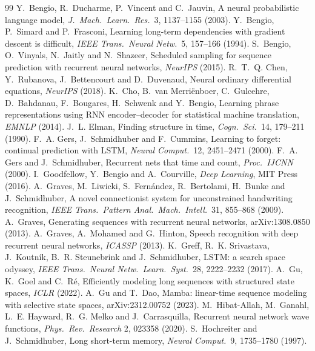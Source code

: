 \documentclass[11pt]{article}
\begin{document}
\begin{thebibliography}{99}\small
{} Y.~Bengio, R.~Ducharme, P.~Vincent and C.~Jauvin, A neural probabilistic language model, \emph{J.\ Mach.\ Learn.\ Res.}\ 3, 1137--1155 (2003).
 Y.~Bengio, P.~Simard and P.~Frasconi, Learning long-term dependencies with gradient descent is difficult, \emph{IEEE Trans.\ Neural Netw.}\ 5, 157--166 (1994).
 S.~Bengio, O.~Vinyals, N.~Jaitly and N.~Shazeer, Scheduled sampling for sequence prediction with recurrent neural networks, \emph{NeurIPS} (2015).
 R.~T.~Q. Chen, Y.~Rubanova, J.~Bettencourt and D.~Duvenaud, Neural ordinary differential equations, \emph{NeurIPS} (2018).
 K.~Cho, B.~van Merri\"enboer, C.~Gulcehre, D.~Bahdanau, F.~Bougares, H.~Schwenk and Y.~Bengio, Learning phrase representations using RNN encoder--decoder for statistical machine translation, \emph{EMNLP} (2014).
 J.~L. Elman, Finding structure in time, \emph{Cogn.\ Sci.}\ 14, 179--211 (1990).
 F.~A. Gers, J.~Schmidhuber and F.~Cummins, Learning to forget: continual prediction with LSTM, \emph{Neural Comput.}\ 12, 2451--2471 (2000).
 F.~A. Gers and J.~Schmidhuber, Recurrent nets that time and count, \emph{Proc.\ IJCNN} (2000).
 I.~Goodfellow, Y.~Bengio and A.~Courville, \emph{Deep Learning}, MIT Press (2016).
 A.~Graves, M.~Liwicki, S.~Fern\'andez, R.~Bertolami, H.~Bunke and J.~Schmidhuber, A novel connectionist system for unconstrained handwriting recognition, \emph{IEEE Trans.\ Pattern Anal.\ Mach.\ Intell.}\ 31, 855--868 (2009).
 A.~Graves, Generating sequences with recurrent neural networks, arXiv:1308.0850 (2013).
 A.~Graves, A.~Mohamed and G.~Hinton, Speech recognition with deep recurrent neural networks, \emph{ICASSP} (2013).
 K.~Greff, R.~K. Srivastava, J.~Koutn\'ik, B.~R. Steunebrink and J.~Schmidhuber, LSTM: a search space odyssey, \emph{IEEE Trans.\ Neural Netw.\ Learn.\ Syst.}\ 28, 2222--2232 (2017).
 A.~Gu, K.~Goel and C.~R\'e, Efficiently modeling long sequences with structured state spaces, \emph{ICLR} (2022).
 A.~Gu and T.~Dao, Mamba: linear-time sequence modeling with selective state spaces, arXiv:2312.00752 (2023).
 M.~Hibat-Allah, M.~Ganahl, L.~E. Hayward, R.~G. Melko and J.~Carrasquilla, Recurrent neural network wave functions, \emph{Phys.\ Rev.\ Research} 2, 023358 (2020).
 S.~Hochreiter and J.~Schmidhuber, Long short-term memory, \emph{Neural Comput.}\ 9, 1735--1780 (1997).

\end{thebibliography}
\end{document}
